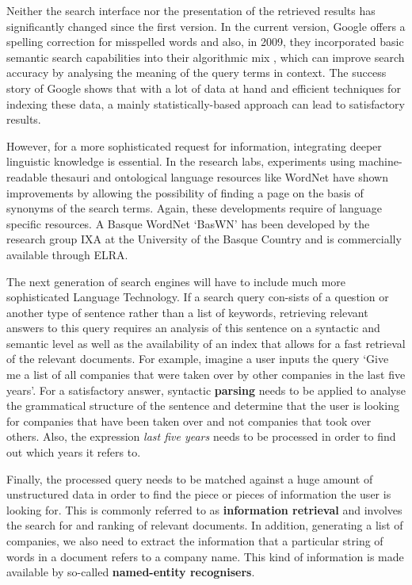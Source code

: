 \begin{multicols}{2}
Neither the search interface nor the presentation of the retrieved results has significantly changed since the first version. In the current version, Google offers a spelling correction for misspelled words and also, in 2009, they incorporated basic semantic search capabilities into their algorithmic mix \cite{BAS-Nota28}, which can improve search accuracy by analysing the meaning of the query terms in context. The success story of Google shows that with a lot of data at hand and efficient techniques for indexing these data, a mainly statistically-based approach can lead to satisfactory results.
 
However, for a more sophisticated request for information, integrating deeper linguistic knowledge is essential. In the research labs, experiments using machine-readable thesauri and ontological language resources like WordNet have shown improvements by allowing the possibility of finding a page on the basis of synonyms of the search terms. Again, these developments require of language specific resources. A Basque WordNet ‘BasWN’ has been developed by the research group IXA at the University of the Basque Country and is commercially available through ELRA. 


The next generation of search engines will have to include much more sophisticated Language Technology. If a search query con-sists of a question or another type of sentence rather than a list of keywords, retrieving relevant answers to this query requires an analysis of this sentence on a syntactic and semantic level as well as the availability of an index that allows for a fast retrieval of the relevant documents. For example, imagine a user inputs the query ‘Give me a list of all companies that were taken over by other companies in the last five years’. For a satisfactory answer, syntactic \textbf{parsing} needs to be applied to analyse the grammatical structure of the sentence and determine that the user is looking for companies that have been taken over and not companies that took over others. Also, the expression \textit{last five years} needs to be processed in order to find out which years it refers to. 

Finally, the processed query needs to be matched against a huge amount of unstructured data in order to find the piece or pieces of information the user is looking for. This is commonly referred to as \textbf{information retrieval} and involves the search for and ranking of relevant documents. In addition, generating a list of companies, we also need to extract the information that a particular string of words in a document refers to a company name. This kind of information is made available by so-called \textbf{named-entity recognisers}. 


\end{multicols}
